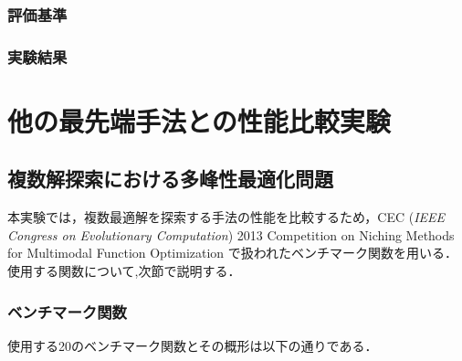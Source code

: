 \documentclass[a4j,11pt]{jarticle}
\begin{document}
\subsubsection{評価基準}
\label{sss:DNRBA-eval}
\subsubsection{実験結果}
\label{sss:DNRBA-results}


\FloatBarrier
\newpage
\section{他の最先端手法との性能比較実験}
\label{sec:experiment}


\subsection{複数解探索における多峰性最適化問題}
\label{ss:cec2013}
本実験では，複数最適解を探索する手法の性能を比較するため，CEC ({\it IEEE Congress on Evolutionary Computation}) 2013 Competition on Niching Methods for Multimodal Function Optimization \cite{CEC2013} で扱われたベンチマーク関数を用いる．使用する関数について,次節で説明する．

\subsubsection{ベンチマーク関数}
\label{sss:benchmark}
使用する20のベンチマーク関数とその概形は以下の通りである．
\end{document}
